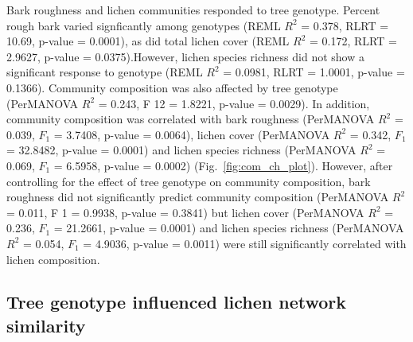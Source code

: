 \documentclass[9pt,twocolumn,twoside,lineno]{pnas-new}
\begin{document}
{Bark roughness and lichen communities responded to tree
genotype. Percent rough bark varied signficantly among genotypes (REML
$R^2$ = 0.378, RLRT = 10.69, p-value = 0.0001), as did total lichen
cover (REML $R^2$ = 0.172, RLRT = 2.9627, p-value = 0.0375).However,
lichen species richness did not show a significant response to
genotype (REML $R^2$ = 0.0981, RLRT = 1.0001, p-value =
0.1366). Community composition was also affected by tree genotype
(PerMANOVA $R^2$ = 0.243, F 12 = 1.8221, p-value = 0.0029). In
addition, community composition was correlated with bark roughness
(PerMANOVA $R^2$ = 0.039, $F_1$ = 3.7408, p-value = 0.0064), lichen
cover (PerMANOVA $R^2$ = 0.342, $F_1$ = 32.8482, p-value = 0.0001) and
lichen species richness (PerMANOVA $R^2$ = 0.069, $F_1$ = 6.5958,
p-value = 0.0002) (Fig.~\ref{fig:com_ch_plot}). However, after
controlling for the effect of tree genotype on community composition,
bark roughness did not significantly predict community composition
(PerMANOVA $R^2$ = 0.011, F 1 = 0.9938, p-value = 0.3841) but lichen
cover (PerMANOVA $R^2$ = 0.236, $F_1$ = 21.2661, p-value = 0.0001)
and lichen species richness (PerMANOVA $R^2$ = 0.054, $F_1$ = 4.9036,
p-value = 0.0011) were still significantly correlated with lichen
composition.


\subsection*{Tree genotype influenced lichen network similarity}

}
\end{document}
